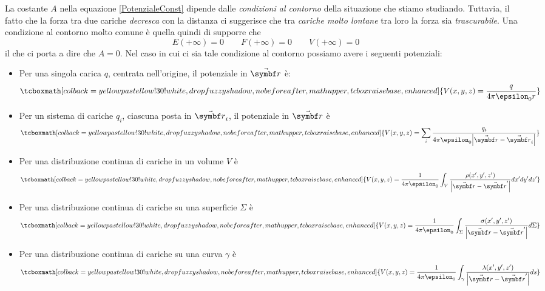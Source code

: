 La costante $A$ nella equazione \eqref{PotenzialeConst} dipende dalle \textit{condizioni al contorno} della situazione che stiamo studiando. Tuttavia, il fatto che la forza tra due cariche \textit{decresca} con la distanza ci suggerisce che tra \textit{cariche molto lontane} tra loro la forza sia \textit{trascurabile}. Una condizione al contorno molto comune è quella quindi di supporre che
\begin{equation}
	E(+\infty)=0\qquad F(+\infty)=0\qquad V(+\infty)=0
\end{equation}
il che ci porta a dire che $A=0$. Nel caso in cui ci sia tale condizione al contorno possiamo avere i seguenti potenziali:
\begin{itemize}
	\item Per una singola carica $q$, centrata nell'origine, il potenziale in $\vba{r}$ è:
	\begin{equation}
		\tcboxmath[colback=yellowpastellow!30!white,drop fuzzy shadow, nobeforeafter, math upper, tcbox raise base, enhanced]{V(x,y,z)=\frac{q}{4\pi\epsilon_0r}}
	\end{equation}
	\item Per un sistema di cariche $q_i$, ciascuna posta in $\vba{r}_i$, il potenziale in $\vba{r}$ è
	\begin{equation}
		\tcboxmath[colback=yellowpastellow!30!white,drop fuzzy shadow, nobeforeafter, math upper, tcbox raise base, enhanced]{V(x,y,z)=\sum_i\frac{q_i}{4\pi\epsilon_0\abs{\vba{r}-\vba{r}_i}}}
	\end{equation}
	\item Per una distribuzione continua di cariche in un volume $V$ è
	\begin{equation}
		\tcboxmath[colback=yellowpastellow!30!white,drop fuzzy shadow, nobeforeafter, math upper, tcbox raise base, enhanced]{V(x,y,z)=\frac{1}{4\pi\epsilon_0}\int_{V}\frac{\rho(x',y',z')}{\abs{\vba{r}-\vba{r}'}}dx'dy'dz'}
	\end{equation}
	\item Per una distribuzione continua di cariche su una superficie $\Sigma$ è
	\begin{equation}
		\tcboxmath[colback=yellowpastellow!30!white,drop fuzzy shadow, nobeforeafter, math upper, tcbox raise base, enhanced]{V(x,y,z)=\frac{1}{4\pi\epsilon_0}\int_{\Sigma}\frac{\sigma(x',y',z')}{\abs{\vba{r}-\vba{r}'}}d\Sigma}
	\end{equation}
	\item Per una distribuzione continua di cariche su una curva $\gamma$ è
	\begin{equation}
		\tcboxmath[colback=yellowpastellow!30!white,drop fuzzy shadow, nobeforeafter, math upper, tcbox raise base, enhanced]{V(x,y,z)=\frac{1}{4\pi\epsilon_0}\int_\gamma\frac{\lambda(x',y',z')}{\abs{\vba{r}-\vba{r}'}}ds}
	\end{equation}
\end{itemize}
